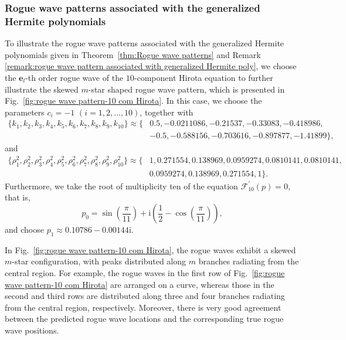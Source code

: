 \documentclass[preprint,3p,10pt]{elsarticle}
\theoremstyle{definition}
\begin{document}
\subsubsection{Rogue wave patterns associated with the generalized Hermite polynomials} \label{sec:rogue wave pattern-generalized Hermite poly}
To illustrate the rogue wave patterns associated with the generalized Hermite polynomials given in Theorem~\ref{thm:Rogue wave patterns} and Remark \ref{remark:rogue wave pattern associated with generalized Hermite poly}, we choose the $\mathbf{e}_l$-th order rogue wave of  the $10$-component Hirota equation to further illustrate the skewed $m$-star shaped rogue wave pattern, which is presented in Fig.~\ref{fig:rogue wave pattern-10 com Hirota}. In this case, we choose the parameters $c_i=-1$ $(i=1,2,\dots,10)$, together with
\begin{equation}
    \begin{aligned}
\{k_1,k_2,k_3,k_4,k_5,k_6,k_7,k_8,k_9,k_{10}\}
\approx
\{&0.5, -0.0211086, -0.21537, -0.33083, -0.418986, \\&-0.5, -0.588156, -0.703616, -0.897877, -1.41899\},
\end{aligned}
\end{equation}
and
\begin{equation}
    \begin{aligned}
\{\rho_1^2,\rho_2^2,\rho_3^2,\rho_4^2,\rho_5^2,\rho_6^2,\rho_7^2,\rho_8^2,\rho_9^2,\rho_{10}^2\}
\approx
\{
&1, 0.271554, 0.138969, 0.0959274, 0.0810141, 0.0810141,\\& 0.0959274, 
0.138969, 0.271554, 1
\}.
    \end{aligned}
\end{equation}
Furthermore, we take the root of multiplicity ten of the equation $\mathcal{F}_{10}^{\prime}(p)=0$, that is,
\begin{equation}
    p_0 = \sin\left(\frac{\pi}{11}\right)+\mathrm{i} \left(\frac{1}{2} - \cos \left(\frac{\pi}{11}\right)\right) ,
\end{equation}
and choose $p_1\approx 0.10786 - 0.00144\mathrm{i}$.

In Fig.~\ref{fig:rogue wave pattern-10 com Hirota}, the rogue waves exhibit a skewed $m$-star configuration, with peaks distributed along $m$ branches radiating from the central region. For example, the rogue waves in the first row of Fig.~\ref{fig:rogue wave pattern-10 com Hirota} are arranged on a curve, whereas those in the second and third rows are distributed along three and four branches radiating from the central region, respectively. Moreover, there is very good agreement between the predicted rogue wave locations and the corresponding true rogue wave positions.
\end{document}
